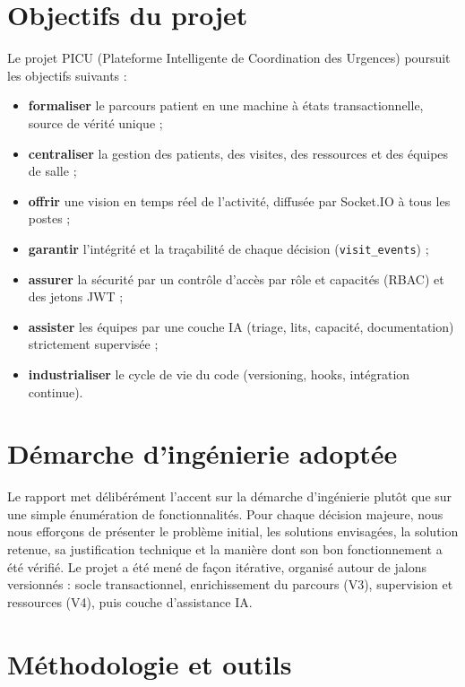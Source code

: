 \section{Objectifs du projet}

Le projet PICU (Plateforme Intelligente de Coordination des Urgences) poursuit les objectifs suivants :

\begin{itemize}
    \item \textbf{formaliser} le parcours patient en une machine à états transactionnelle, source de vérité unique ;
    \item \textbf{centraliser} la gestion des patients, des visites, des ressources et des équipes de salle ;
    \item \textbf{offrir} une vision en temps réel de l'activité, diffusée par Socket.IO à tous les postes ;
    \item \textbf{garantir} l'intégrité et la traçabilité de chaque décision (\texttt{visit\_events}) ;
    \item \textbf{assurer} la sécurité par un contrôle d'accès par rôle et capacités (RBAC) et des jetons JWT ;
    \item \textbf{assister} les équipes par une couche IA (triage, lits, capacité, documentation) strictement supervisée ;
    \item \textbf{industrialiser} le cycle de vie du code (versioning, hooks, intégration continue).
\end{itemize}

\section{Démarche d'ingénierie adoptée}

Le rapport met délibérément l'accent sur la démarche d'ingénierie plutôt que sur une simple énumération de fonctionnalités. Pour chaque décision majeure, nous nous efforçons de présenter le problème initial, les solutions envisagées, la solution retenue, sa justification technique et la manière dont son bon fonctionnement a été vérifié. Le projet a été mené de façon itérative, organisé autour de jalons versionnés : socle transactionnel, enrichissement du parcours (V3), supervision et ressources (V4), puis couche d'assistance IA.

\section{Méthodologie et outils}


